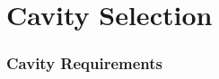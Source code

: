 \documentclass[11pt]{article}
\theoremstyle{definition}
\theoremstyle{remark}
\begin{document}
\part{Cavity Selection}
\label{sec:cavity}


\section{Cavity Requirements}
\label{sec:cav-requirements}
\end{document}
